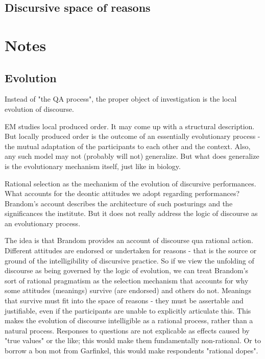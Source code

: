\documentclass[11pt,twoside]{article}
\begin{document}
\subsection{Discursive space of reasons}

\section{Notes}

\subsection{Evolution}

Instead of "the QA process", the proper object of investigation is the
local evolution of discourse.

EM studies local produced order.  It may come up with a structural
description.  But locally produced order is the outcome of an
essentially evolutionary process - the mutual adaptation of the
participants to each other and the context.  Also, any such model may
not (probably will not) generalize.  But what does generalize is the
evolutionary mechanism itself, just like in biology.

Rational selection as the mechanism of the evolution of discursive
performances.  What accounts for the deontic attitudes we adopt
regarding performances?  Brandom's account describes the architecture
of such posturings and the significances the institute.  But it does
not really address the logic of discourse as an evolutionary process.

The idea is that Brandom provides an account of discourse qua rational
action.  Different attitudes are endorsed or undertaken for reasons -
that is the source or ground of the intelligibility of discursive
practice.  So if we view the unfolding of discourse as being governed
by the logic of evolution, we can treat Brandom's sort of rational
pragmatism as the selection mechanism that accounts for why some
attitudes (meanings) survive (are endorsed) and others do not.
Meanings that survive must fit into the space of reasons - they must
be assertable and justifiable, even if the participants are unable to
explicitly articulate this.  This makes the evolution of discourse
intelligible as a rational process, rather than a natural process.
Responses to questions are not explicable as effects caused by "true
values" or the like; this would make them fundamentally non-rational.
Or to borrow a bon mot from Garfinkel, this would make respondents
"rational dopes".
\end{document}
